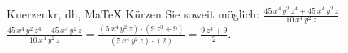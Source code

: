 \begin{MAufgabe}{Kuerzen}{kr, dh, MaTeX}
K\"urzen Sie soweit m\"oglich: $\frac{45\, x^4\, y^2\, z^4 + 45\, x^4\, y^2\, z}{10\, x^4\, y^2\, z}$.\\ 
\ifLsg\MLoesung
\quad $\frac{45\, x^4\, y^2\, z^4 + 45\, x^4\, y^2\, z}{10\, x^4\, y^2\, z}=\frac{(5\, x^4\, y^2\, z)\cdot(9\, z^3 + 9)}{(5\, x^4\, y^2\, z)\cdot(2)}=\frac{9\, z^3 + 9}{2}$.\else\relax\fi
 \end{MAufgabe}